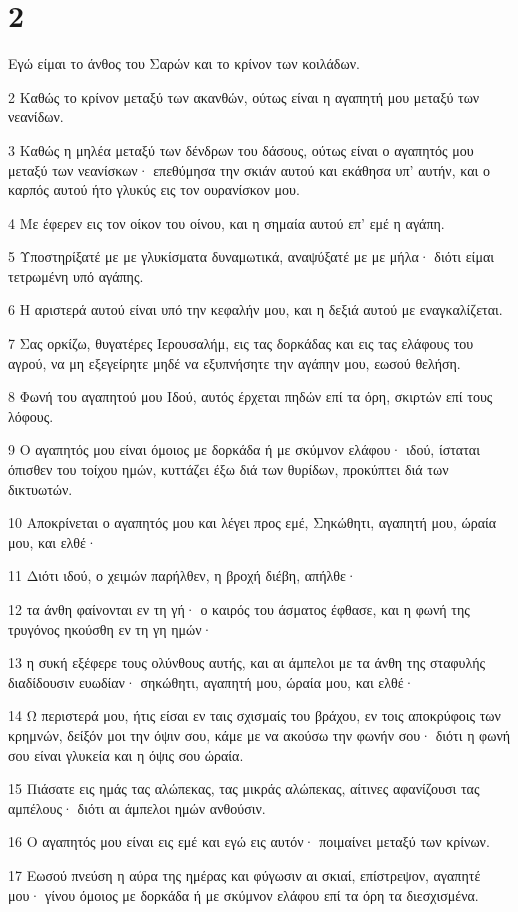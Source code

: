 \chapter{2}

\par Εγώ είμαι το άνθος του Σαρών και το κρίνον των κοιλάδων.
\par 2 Καθώς το κρίνον μεταξύ των ακανθών, ούτως είναι η αγαπητή μου μεταξύ των νεανίδων.
\par 3 Καθώς η μηλέα μεταξύ των δένδρων του δάσους, ούτως είναι ο αγαπητός μου μεταξύ των νεανίσκων· επεθύμησα την σκιάν αυτού και εκάθησα υπ' αυτήν, και ο καρπός αυτού ήτο γλυκύς εις τον ουρανίσκον μου.
\par 4 Με έφερεν εις τον οίκον του οίνου, και η σημαία αυτού επ' εμέ η αγάπη.
\par 5 Υποστηρίξατέ με με γλυκίσματα δυναμωτικά, αναψύξατέ με με μήλα· διότι είμαι τετρωμένη υπό αγάπης.
\par 6 Η αριστερά αυτού είναι υπό την κεφαλήν μου, και η δεξιά αυτού με εναγκαλίζεται.
\par 7 Σας ορκίζω, θυγατέρες Ιερουσαλήμ, εις τας δορκάδας και εις τας ελάφους του αγρού, να μη εξεγείρητε μηδέ να εξυπνήσητε την αγάπην μου, εωσού θελήση.
\par 8 Φωνή του αγαπητού μου Ιδού, αυτός έρχεται πηδών επί τα όρη, σκιρτών επί τους λόφους.
\par 9 Ο αγαπητός μου είναι όμοιος με δορκάδα ή με σκύμνον ελάφου· ιδού, ίσταται όπισθεν του τοίχου ημών, κυττάζει έξω διά των θυρίδων, προκύπτει διά των δικτυωτών.
\par 10 Αποκρίνεται ο αγαπητός μου και λέγει προς εμέ, Σηκώθητι, αγαπητή μου, ώραία μου, και ελθέ·
\par 11 Διότι ιδού, ο χειμών παρήλθεν, η βροχή διέβη, απήλθε·
\par 12 τα άνθη φαίνονται εν τη γή· ο καιρός του άσματος έφθασε, και η φωνή της τρυγόνος ηκούσθη εν τη γη ημών·
\par 13 η συκή εξέφερε τους ολύνθους αυτής, και αι άμπελοι με τα άνθη της σταφυλής διαδίδουσιν ευωδίαν· σηκώθητι, αγαπητή μου, ώραία μου, και ελθέ·
\par 14 Ω περιστερά μου, ήτις είσαι εν ταις σχισμαίς του βράχου, εν τοις αποκρύφοις των κρημνών, δείξόν μοι την όψιν σου, κάμε με να ακούσω την φωνήν σου· διότι η φωνή σου είναι γλυκεία και η όψις σου ώραία.
\par 15 Πιάσατε εις ημάς τας αλώπεκας, τας μικράς αλώπεκας, αίτινες αφανίζουσι τας αμπέλους· διότι αι άμπελοι ημών ανθούσιν.
\par 16 Ο αγαπητός μου είναι εις εμέ και εγώ εις αυτόν· ποιμαίνει μεταξύ των κρίνων.
\par 17 Εωσού πνεύση η αύρα της ημέρας και φύγωσιν αι σκιαί, επίστρεψον, αγαπητέ μου· γίνου όμοιος με δορκάδα ή με σκύμνον ελάφου επί τα όρη τα διεσχισμένα.

